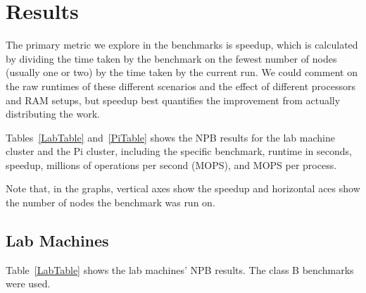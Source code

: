 \documentclass{acm_proc_article-sp}
\begin{document}
\section{Results}
The primary metric we explore in the benchmarks is speedup, which is calculated by dividing the time taken by the benchmark on the fewest number of nodes (usually one or two) by the time taken by the current run. We could comment on the raw runtimes of these different scenarios and the effect of different processors and RAM setups, but speedup best quantifies the improvement from actually distributing the work.

Tables~\ref{LabTable} and~\ref{PiTable} shows the NPB results for the lab machine cluster and the Pi cluster, including the specific benchmark, runtime in seconds, speedup, millions of operations per second (MOPS), and MOPS per process.

Note that, in the graphs, vertical axes show the speedup and horizontal aces show the number of nodes the benchmark was run on.

\subsection{Lab Machines}

Table~\ref{LabTable} shows the lab machines' NPB results. The class B benchmarks were used.
\end{document}
